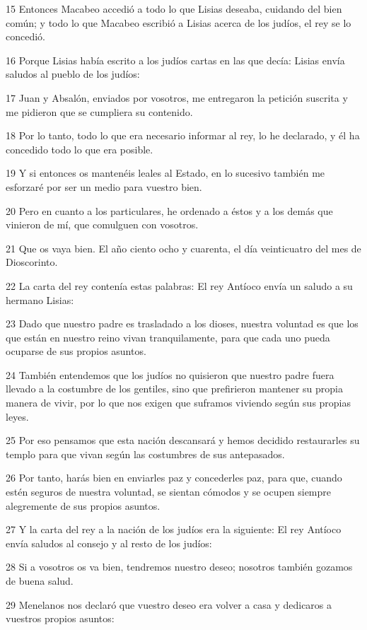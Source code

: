 \par 15 Entonces Macabeo accedió a todo lo que Lisias deseaba, cuidando del bien común; y todo lo que Macabeo escribió a Lisias acerca de los judíos, el rey se lo concedió.
\par 16 Porque Lisias había escrito a los judíos cartas en las que decía: Lisias envía saludos al pueblo de los judíos:
\par 17 Juan y Absalón, enviados por vosotros, me entregaron la petición suscrita y me pidieron que se cumpliera su contenido.
\par 18 Por lo tanto, todo lo que era necesario informar al rey, lo he declarado, y él ha concedido todo lo que era posible.
\par 19 Y si entonces os mantenéis leales al Estado, en lo sucesivo también me esforzaré por ser un medio para vuestro bien.
\par 20 Pero en cuanto a los particulares, he ordenado a éstos y a los demás que vinieron de mí, que comulguen con vosotros.
\par 21 Que os vaya bien. El año ciento ocho y cuarenta, el día veinticuatro del mes de Dioscorinto.
\par 22 La carta del rey contenía estas palabras: El rey Antíoco envía un saludo a su hermano Lisias:
\par 23 Dado que nuestro padre es trasladado a los dioses, nuestra voluntad es que los que están en nuestro reino vivan tranquilamente, para que cada uno pueda ocuparse de sus propios asuntos.
\par 24 También entendemos que los judíos no quisieron que nuestro padre fuera llevado a la costumbre de los gentiles, sino que prefirieron mantener su propia manera de vivir, por lo que nos exigen que suframos viviendo según sus propias leyes.
\par 25 Por eso pensamos que esta nación descansará y hemos decidido restaurarles su templo para que vivan según las costumbres de sus antepasados.
\par 26 Por tanto, harás bien en enviarles paz y concederles paz, para que, cuando estén seguros de nuestra voluntad, se sientan cómodos y se ocupen siempre alegremente de sus propios asuntos.
\par 27 Y la carta del rey a la nación de los judíos era la siguiente: El rey Antíoco envía saludos al consejo y al resto de los judíos:
\par 28 Si a vosotros os va bien, tendremos nuestro deseo; nosotros también gozamos de buena salud.
\par 29 Menelanos nos declaró que vuestro deseo era volver a casa y dedicaros a vuestros propios asuntos:
